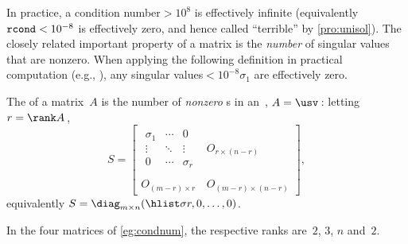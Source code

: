 In practice, a condition number\({}>10^8\) is effectively infinite (equivalently \(\verb|rcond|<10^{-8}\) is effectively zero, and hence called ``terrible'' by \autoref{pro:unisol}).
The closely related important property of a matrix is the \emph{number} of singular values that are nonzero.
When applying the following definition in practical computation (e.g., \script), any singular values\({}<10^{-8}\sigma_1\) are effectively zero.


\begin{definition} \label{def:rank}
    The  of a matrix~$A$ is the number of \emph{nonzero} s in an~\svd, \(A=\usv\)\,:
    letting \(r=\rank A\)\,,
\begin{equation*}
S=\begin{bmatrix} \begin{matrix} \sigma_1&\cdots&0\\
\vdots&\ddots&\vdots\\
0&\cdots&\sigma_r \end{matrix} & 
O_{r\times (n-r)}\\\,\\
O_{(m-r)\times r}&O_{(m-r)\times (n-r)}\end{bmatrix},
\end{equation*}
equivalently \(S=\diag_{m\times n}(\hlist\sigma r,0,\ldots,0)\).
\end{definition}

\begin{example} \label{eg:}
In the four matrices of \autoref{eg:condnum}, the respective ranks are~\(2\), \(3\), \(n\) and~\(2\).
\end{example}

